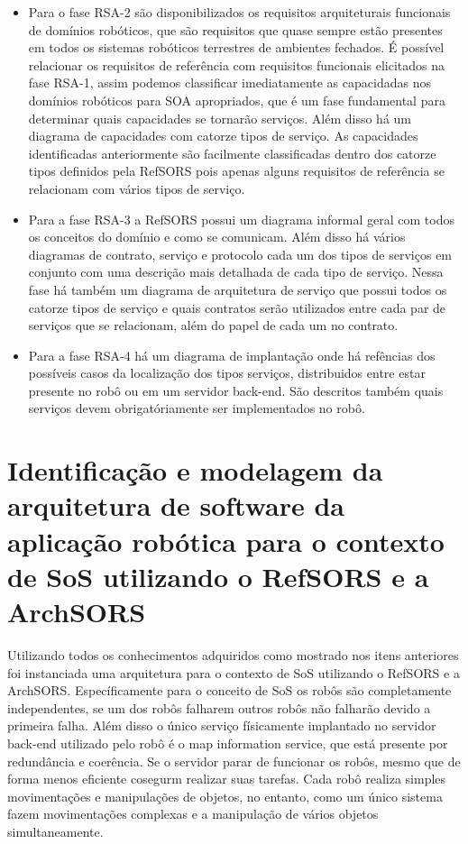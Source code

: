 \documentclass[12pt]{report}
\begin{document}
\begin{itemize}
\item Para o fase RSA-2 são disponibilizados os requisitos arquiteturais funcionais de domínios robóticos, que são requisitos que quase sempre estão presentes em todos os sistemas robóticos terrestres de ambientes fechados. É possível relacionar os requisitos de referência com requisitos funcionais elicitados na fase RSA-1, assim podemos classificar imediatamente as capacidadas nos domínios robóticos para SOA apropriados, que é um fase fundamental para determinar quais capacidades se tornarão serviços. Além disso há um diagrama de capacidades com catorze tipos de serviço. As capacidades identificadas anteriormente são facilmente classificadas dentro dos catorze tipos definidos pela RefSORS pois apenas alguns requisitos de referência se relacionam com vários tipos de serviço.
\item Para a fase RSA-3 a RefSORS possui um diagrama informal geral com todos os conceitos do domínio e como se comunicam. Além disso há vários diagramas de contrato, serviço e protocolo cada um dos tipos de serviços em conjunto com uma descrição mais detalhada de cada tipo de serviço. Nessa fase há também um diagrama de arquitetura de serviço que possui todos os catorze tipos de serviço e quais contratos serão utilizados entre cada par de serviços que se relacionam, além do papel de cada um no contrato.
\item Para a fase RSA-4 há um diagrama de implantação onde há refências dos possíveis casos da localização dos tipos serviços, distribuidos entre estar presente no robô ou em um servidor back-end. São descritos também quais serviços devem obrigatóriamente ser implementados no robô.  
\end{itemize}
\section{Identificação e modelagem da arquitetura de software da aplicação robótica para o contexto de SoS utilizando o RefSORS e a ArchSORS}\label{identificacao}
Utilizando todos os conhecimentos adquiridos como mostrado nos itens anteriores foi instanciada uma arquitetura para o contexto de SoS utilizando o RefSORS e a ArchSORS. Específicamente para o conceito de SoS os robôs são completamente independentes, se um dos robôs falharem outros robôs não falharão devido a primeira falha. Além disso o único serviço físicamente implantado no servidor back-end utilizado pelo robô é o map information service, que está presente por redundância e coerência. Se o servidor parar de funcionar os robôs, mesmo que de forma menos eficiente cosegurm realizar suas tarefas. Cada robô realiza simples movimentações e manipulações de objetos, no entanto, como um único sistema fazem movimentações complexas e a manipulação de vários objetos simultaneamente. 
\end{document}
